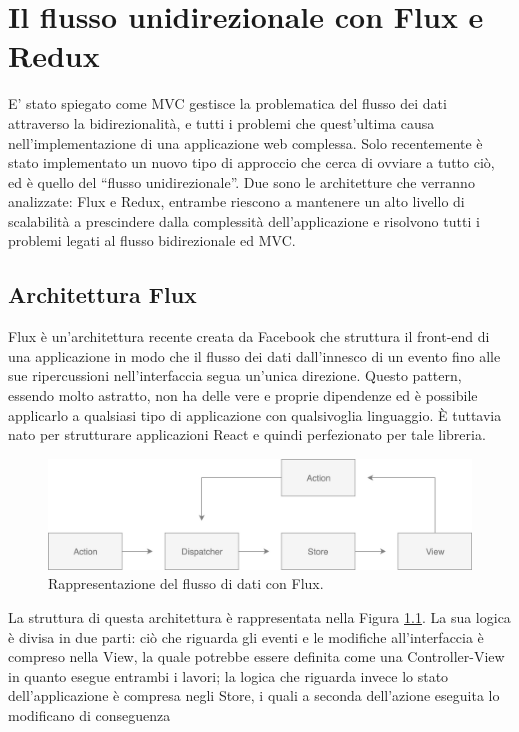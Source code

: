 \chapter{Il flusso unidirezionale con Flux e Redux}
E' stato spiegato come MVC gestisce la problematica del flusso dei dati attraverso la bidirezionalità, e tutti i problemi che quest'ultima causa nell'implementazione di una applicazione web complessa. Solo recentemente è stato implementato un nuovo tipo di approccio che cerca di ovviare a tutto ciò, ed è quello del “flusso unidirezionale”. Due sono le architetture che verranno analizzate: Flux e Redux, entrambe riescono a mantenere un alto livello di scalabilità a prescindere dalla complessità dell'applicazione e risolvono tutti i problemi legati al flusso bidirezionale ed MVC.

\section{Architettura Flux}
\label{FluxArchitecture}
Flux è un'architettura recente creata da Facebook che struttura il front-end di una applicazione in modo che il flusso dei dati dall'innesco di un evento fino alle sue ripercussioni nell'interfaccia segua un'unica direzione.
Questo pattern, essendo molto astratto, non ha delle vere e proprie dipendenze ed è possibile applicarlo a qualsiasi tipo di applicazione con qualsivoglia linguaggio. È tuttavia nato per strutturare applicazioni React e quindi perfezionato per tale libreria.

\begin{figure}[h]
\centering
\vspace*{0.5cm} 
\includegraphics[width=14cm]{./images/FluxWorkflow}
\caption{Rappresentazione del flusso di dati con Flux.}
\label{FluxWorkflow}
\vspace*{0.5cm} 
\end{figure}

La struttura di questa architettura è rappresentata nella Figura \ref{FluxWorkflow}. La sua logica è divisa in due parti: ciò che riguarda gli eventi e le modifiche all'interfaccia è compreso nella View, la quale potrebbe essere definita come una Controller-View in quanto esegue entrambi i lavori; la logica che riguarda invece lo stato dell'applicazione è compresa negli Store, i quali a seconda dell'azione eseguita lo modificano di conseguenza

